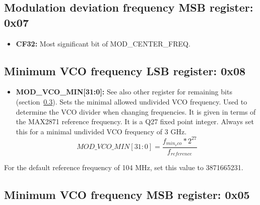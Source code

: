 \documentclass{article}
\newcommand{\bitrect}[2]{
  \begin{pgfonlayer}{foreground}
    \draw [thick] (0,0) rectangle (#1,1);
    \pgfmathsetmacro\result{#1-1}
    \foreach \x in {1,...,\result}
      \draw [thick] (\x,1) -- (\x, 0.8);
  \end{pgfonlayer}
  \bitlabels{#1}{#2}
}
\newcommand{\rwbits}[3]{
  \draw [thick] (#1,0) rectangle ++(#2,1) node[pos=0.5]{#3};
  \pgfmathsetmacro\start{#1+0.5}
  \pgfmathsetmacro\finish{#1+#2-0.5}
}
\newcommand{\robits}[3]{
  \begin{pgfonlayer}{background}
    \draw [thick, fill=lightgray] (#1,0) rectangle ++(#2,1) node[pos=0.5]{#3};
  \end{pgfonlayer}
  \pgfmathsetmacro\start{#1+0.5}
  \pgfmathsetmacro\finish{#1+#2-0.5}
}
\newcommand{\bitlabels}[2]{
  \foreach \bit in {1,...,#1}{
     \pgfmathsetmacro\result{#2}
     \node [above] at (\bit-0.5, 1) {\pgfmathprintnumber{\result}};
   }
}
\begin{document}
\subsection{Modulation deviation frequency MSB register: 0x07}
\label{reg:mod:dev:msb}
\begin{center}
\end{center}
\begin{itemize}
\item \textbf{CF32:} Most significant bit of MOD\_CENTER\_FREQ.
\end{itemize}

\subsection{Minimum VCO frequency LSB register: 0x08}
\label{reg:mod:minvco:lsb}
\begin{center}
\end{center}
\begin{itemize}
\item \textbf{MOD\_VCO\_MIN[31:0]:} See also other register for remaining bits (section~\ref{reg:mod:minvco:msb}). Sets the minimal allowed undivided VCO frequency. Used to determine the VCO divider when changing frequencies. It is given in terms of the MAX2871 reference frequency. It is a Q27 fixed point integer. Always set this for a minimal undivided VCO frequency of 3 GHz.
$$
MOD\_VCO\_MIN[31:0] = \frac{f_{min_vco} * 2^{27}}{f_{reference}}
$$
\end{itemize}
For the default reference frequency of 104 MHz, set this value to 3871665231.

\subsection{Minimum VCO frequency MSB register: 0x05}
\label{reg:mod:minvco:msb}
\begin{center}
\end{center}
\end{document}
